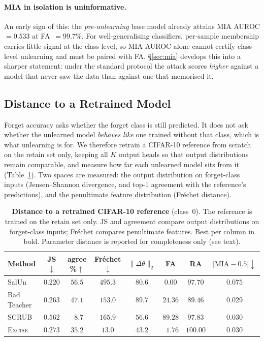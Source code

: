 \documentclass{article}
\newcommand{\ours}{\textsc{Excise}}
\theoremstyle{remark}
\theoremstyle{plain}
\begin{document}
\paragraph{MIA in isolation is uninformative.}
An early sign of this: the \emph{pre-unlearning} base model already attains MIA
AUROC $=0.533$ at FA~$=99.7\%$. For well-generalising classifiers, per-sample
membership carries little signal at the class level, so MIA AUROC alone cannot
certify class-level unlearning and must be paired with FA. \S\ref{sec:mia}
develops this into a sharper statement: under the standard protocol the attack
scores \emph{higher} against a model that never saw the data than against one
that memorised it.

\subsection{Distance to a Retrained Model}\label{sec:distance}

Forget accuracy asks whether the forget class is still predicted. It does not
ask whether the unlearned model \emph{behaves like} one trained without that
class, which is what unlearning is for. We therefore retrain a CIFAR-10
reference from scratch on the retain set only, keeping all $K$ output heads so
that output distributions remain comparable, and measure how far each unlearned
model sits from it (Table~\ref{tab:distance}). Two spaces are measured: the
output distribution on forget-class inputs (Jensen--Shannon divergence, and
top-1 agreement with the reference's predictions), and the penultimate feature
distribution (Fr\'echet distance).

\begin{table}[t]
\centering
\caption{\textbf{Distance to a retrained CIFAR-10 reference} (class~0). The
reference is trained on the retain set only. JS and agreement compare output
distributions on forget-class inputs; Fr\'echet compares penultimate features.
Best per column in bold. Parameter distance is reported for completeness only
(see text).}
\label{tab:distance}
\begin{tabular}{@{}lccccccc@{}}
\toprule
Method & JS$\downarrow$ & agree \%$\uparrow$ & Fr\'echet$\downarrow$ &
$\|\Delta\theta\|_2$ & FA & RA & $|\mathrm{MIA}{-}0.5|\downarrow$ \\
\midrule
SalUn        & $\mathbf{0.220}$ & $\mathbf{56.5}$ & $495.3$ & $80.6$ & $0.00$  & $97.70$ & $0.075$ \\
Bad Teacher  & $0.263$ & $47.1$ & $153.0$ & $89.7$ & $24.36$ & $89.46$ & $\mathbf{0.029}$ \\
SCRUB        & $0.562$ & $\phantom{0}8.7$ & $165.9$ & $56.6$ & $89.28$ & $97.83$ & $0.030$ \\
\midrule
\ours{}      & $0.273$ & $35.2$ & $\mathbf{13.0}$ & $43.2$ & $\phantom{0}1.76$ & $\mathbf{100.00}$ & $0.030$ \\
\bottomrule
\end{tabular}
\end{table}
\end{document}
